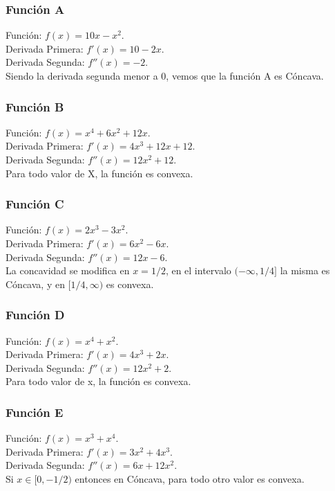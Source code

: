 \begin{homeworkProblem}

\subsubsection{Función A}
Función: $f(x)=10x-x^2$.\\
Derivada Primera: $f'(x)=10-2x$.\\
Derivada Segunda: $f''(x)=-2$.\\
Siendo la derivada segunda menor a 0, vemos que la función A es Cóncava.

\subsubsection{Función B}
Función: $f(x)=x^4+6x^2+12x$.\\
Derivada Primera: $f'(x)=4x^3+12x + 12$.\\
Derivada Segunda: $f''(x)=12x^2+12$.\\
Para todo valor de X, la función es convexa.

\subsubsection{Función C}
Función: $f(x)=2x^3 - 3x^2$.\\
Derivada Primera: $f'(x)=6x^2-6x$.\\
Derivada Segunda: $f''(x)=12x-6$.\\
La concavidad se modifica en $x=1/2$, en el intervalo $(-\infty,1/4]$ la misma es Cóncava, y en $[1/4,\infty)$ es convexa.


\subsubsection{Función D}
Función: $f(x)=x^4 + x^2$.\\
Derivada Primera: $f'(x)=4x^3 + 2x$.\\
Derivada Segunda: $f''(x)=12x^2 + 2$.\\
Para todo valor de x, la función es convexa.


\subsubsection{Función E}
Función: $f(x)=x^3+x^4$.\\
Derivada Primera: $f'(x)=3x^2 + 4x^3$.\\
Derivada Segunda: $f''(x)=6x + 12x^2$.\\
Si $x \in [0, -1/2)$ entonces en Cóncava, para todo otro valor es convexa.

\end{homeworkProblem}